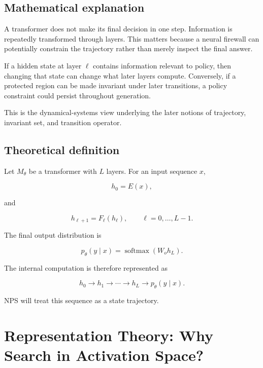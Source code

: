 \documentclass[11pt]{article}
\begin{document}
\subsection*{Mathematical explanation}

A transformer does not make its final decision in one step. Information is
repeatedly transformed through layers. This matters because a neural
firewall can potentially constrain the trajectory rather than merely inspect
the final answer.

If a hidden state at layer $\ell$ contains information relevant to policy,
then changing that state can change what later layers compute. Conversely, if
a protected region can be made invariant under later transitions, a policy
constraint could persist throughout generation.

This is the dynamical-systems view underlying the later notions of
trajectory, invariant set, and transition operator.

\subsection*{Theoretical definition}

Let $M_\theta$ be a transformer with $L$ layers. For an input sequence $x$,

\begin{equation}
h_0=E(x),
\end{equation}

and

\begin{equation}
h_{\ell+1}=F_\ell(h_\ell),
\qquad
\ell=0,\ldots,L-1.
\end{equation}

The final output distribution is

\begin{equation}
p_\theta(y\mid x)
=
\operatorname{softmax}(W_o h_L).
\end{equation}

The internal computation is therefore represented as

\begin{equation}
h_0
\rightarrow
h_1
\rightarrow
\cdots
\rightarrow
h_L
\rightarrow
p_\theta(y\mid x).
\end{equation}

NPS will treat this sequence as a state trajectory.

\section{Representation Theory: Why Search in Activation Space?}
\end{document}
